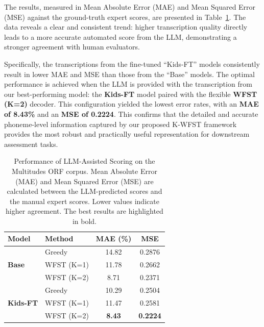 The results, measured in Mean Absolute Error (MAE) and Mean Squared Error (MSE) against the ground-truth expert scores, are presented in Table~\ref{tab:llm-scoring-results}. The data reveals a clear and consistent trend: higher transcription quality directly leads to a more accurate automated score from the LLM, demonstrating a stronger agreement with human evaluators.

Specifically, the transcriptions from the fine-tuned ``Kids-FT'' models consistently result in lower MAE and MSE than those from the ``Base'' models. The optimal performance is achieved when the LLM is provided with the transcription from our best-performing model: the \textbf{Kids-FT} model paired with the flexible \textbf{WFST (K=2)} decoder. This configuration yielded the lowest error rates, with an \textbf{MAE of 8.43\%} and an \textbf{MSE of 0.2224}. This confirms that the detailed and accurate phoneme-level information captured by our proposed K-WFST framework provides the most robust and practically useful representation for downstream assessment tasks.

\begin{table}[h]
\centering
\caption{Performance of LLM-Assisted Scoring on the Multitudes ORF corpus.  Mean Absolute Error (MAE) and Mean
Squared Error (MSE) are calculated between the LLM-predicted scores and the manual expert scores. Lower values indicate higher agreement. The best results are highlighted in bold.}
\label{tab:llm-scoring-results}
\vspace{-2mm}
\begin{tabular}{llcc}
\toprule
\textbf{Model} & \textbf{Method} & \textbf{MAE (\%)} & \textbf{MSE} \\
\midrule
\multirow{3}{*}{\textbf{Base}}
& Greedy & 14.82 & 0.2876 \\
& WFST (K=1) & 11.78 & 0.2662 \\
& WFST (K=2) & 8.71 & 0.2371 \\
\midrule
\multirow{3}{*}{\textbf{Kids-FT}}
& Greedy & 10.29 & 0.2504 \\
& WFST (K=1) & 11.47 & 0.2581 \\
& WFST (K=2) & \textbf{8.43} & \textbf{0.2224} \\
\bottomrule
\end{tabular}
\vspace{-5mm}
\end{table}






